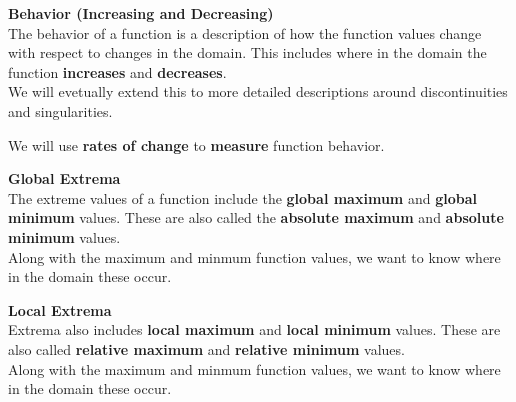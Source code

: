 \documentclass{ximera}
\begin{document}
\begin{explanation}  \textbf{\textcolor{blue!75!black}{Behavior (Increasing and Decreasing)}} \\

The behavior of a function is a description of how the function values change with respect to changes in the domain.  This includes where in the domain the function \textbf{\textcolor{purple!85!blue}{increases}} and \textbf{\textcolor{purple!85!blue}{decreases}}. \\


We will evetually extend this to more detailed descriptions around discontinuities and singularities.


We will use \textbf{rates of change} to \textbf{measure} function behavior.

\end{explanation}









\begin{explanation}  \textbf{\textcolor{blue!75!black}{Global Extrema}} \\

The extreme values of a function include the \textbf{\textcolor{purple!85!blue}{global maximum}} and \textbf{\textcolor{purple!85!blue}{global minimum}} values. These are also called the \textbf{\textcolor{purple!85!blue}{absolute maximum}} and \textbf{\textcolor{purple!85!blue}{absolute minimum}} values.  \\



Along with the maximum and minmum function values, we want to know where in the domain these occur.


\end{explanation}










\begin{explanation}  \textbf{\textcolor{blue!75!black}{Local Extrema}} \\

Extrema also includes \textbf{\textcolor{purple!85!blue}{local maximum}} and \textbf{\textcolor{purple!85!blue}{local minimum}} values. These are also called \textbf{\textcolor{purple!85!blue}{relative maximum}} and \textbf{\textcolor{purple!85!blue}{relative minimum}} values.  \\


Along with the maximum and minmum function values, we want to know where in the domain these occur.


\end{explanation}
\end{document}
